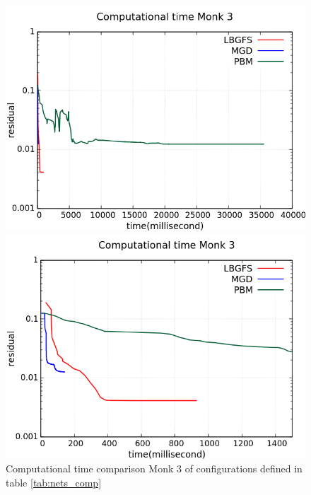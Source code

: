\begin{figure}[H]
	\centering
	\begin{minipage}[t]{0.5\linewidth}
		\includegraphics[width=\linewidth]{data/Comparison/Monk3/Monk3_CT_Comparison_log_standard.png}
	\end{minipage}%
	\begin{minipage}[t]{0.5\linewidth}
		\includegraphics[width=\linewidth]{data/Comparison/Monk3/Monk3_CT_Comparison_log_zoom.png}
	\end{minipage}
	\caption{Computational time comparison Monk 3 of configurations defined in table \ref{tab:nets_comp}}
	\label{CT-Monk3}
\end{figure}

